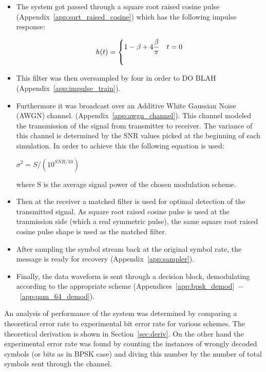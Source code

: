 \documentclass[]{article}
\begin{document}
\begin{itemize}
\item The system got passed through a square root raised cosine pulse (Appendix~\ref{app:sqrt_raised_cosine}) which has the following impulse response:

 \[
 h(t) = \begin{dcases*}
        1-\beta+4\frac{\beta}{\pi} &  $t = 0$\\         
         \\ 
        \end{dcases*}
\]

\item This filter was then oversampled by four in order to DO BLAH (Appendix~\ref{app:impulse_train}).
\item Furthermore it was broadcast over an Additive White Gaussian Noise (AWGN) channel. (Appendix~\ref{app:awgn_channel}). This channel modeled the transmission of the signal from transmitter to receiver. The variance of this channel is determined by the SNR values picked at the beginning of each simulation. In order to achieve this the following equation is used:

$\sigma^2 = S/(10^{SNR/10})$

where S is the average signal power of the chosen modulation scheme.

\item Then at the receiver a matched filter is used for optimal detection of the transmitted signal. As square root raised cosine pulse is used at the tranmission side (which a real symmetric pulse), the same square root raised cosine pulse shape is used as the matched filter.  

\item After sampling the symbol stream back at the original symbol rate, the message is ready for recovery (Appendix~\ref{app:sampler}).

\item Finally, the data waveform is sent through a decision block, demodulating according to the appropriate scheme (Appendices~\ref{app:bpsk_demod}~$-$~\ref{app:qam_64_demod}).

\end{itemize}

An analysis of performance of the system was determined by comparing a theoretical error rate to experimental bit error rate for various schemes.  The theoretical derivation is shown in Section~\ref{sec:deriv}. On the other hand the experimental error rate was found by counting the instances of wrongly decoded symbols (or bits as in BPSK case) and diving this number by the number of total symbols sent through the channel.  
\end{document}
